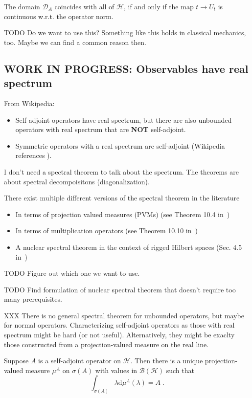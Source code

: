 \begin{remark}
	The domain $\mathcal{D}_{A}$ coincides with all of $\mathcal{H}$, if and only if the map $t \to U_{t}$ is continuous w.r.t. the operator norm.
\end{remark}

TODO Do we want to use this? Something like this holds in classical mechanics, too. Maybe we can find a common reason then.


\subsection{WORK IN PROGRESS: Observables have real spectrum}
From Wikipedia:
\begin{itemize}
	\item Self-adjoint operators have real spectrum, but there are also unbounded operators with real spectrum that are \textbf{NOT} self-adjoint.
	\item Symmetric operators with a real spectrum are self-adjoint (Wikipedia references \cite{bebiano19}).
\end{itemize}

I don't need a spectral theorem to talk about the spectrum. The theorems are about spectral decompoisitons (diagonalization).

There exist multiple different versions of the spectral theorem in the literature
\begin{itemize}
	\item In terms of projection valued measures (PVMs) (see Theorem 10.4 in~\cite{hall13})
	\item In terms of multiplication operators (see Theorem 10.10 in~\cite{hall13})
	\item A nuclear spectral theorem in the context of rigged Hilbert spaces (Sec. 4.5 in~\cite{gelfand64})
\end{itemize}
TODO Figure out which one we want to use.

TODO Find formulation of nuclear spectral theorem that doesn't require too many prerequisites.

XXX There is no general spectral theorem for unbounded operators, but maybe for normal operators. Characterizing self-adjoint operators as those with real spectrum might be hard (or not useful). Alternatively, they might be exaclty those constructed from a projection-valued measure on the real line.

\begin{thrm}\label{rp_qm_obs_spectral_pvm}
	Suppose $A$ is a self-adjoint operator on $\mathcal{H}$. Then there is a unique projection-valued measure $\mu^{A}$ on $\sigma(A)$ with values in $\mathcal{B}(\mathcal{H})$ such that
	\begin{equation}
		\int_{\sigma(A)} \lambda \mathrm d\mu^{A}(\lambda) = A \; .
	\end{equation}
\end{thrm}

